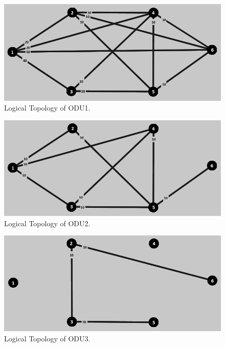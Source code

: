 \begin{figure}[H]
\centering
\includegraphics[width=13cm]{sdf/heuristic/figures/topologies/opaque_surv/medium/logical_topology_odu1_medium}
\caption{Logical Topology of ODU1.}
\label{logical_ODU1_surv_ref_medium_heuristic}
\end{figure}

\begin{figure}[H]
\centering
\includegraphics[width=13cm]{sdf/heuristic/figures/topologies/opaque_surv/medium/logical_topology_odu2_medium}
\caption{Logical Topology of ODU2.}
\label{logical_ODU2_surv_ref_medium_heuristic}
\end{figure}

\begin{figure}[H]
\centering
\includegraphics[width=13cm]{sdf/heuristic/figures/topologies/opaque_surv/medium/logical_topology_odu3_medium}
\caption{Logical Topology of ODU3.}
\label{logical_ODU3_surv_ref_medium_heuristic}
\end{figure}

